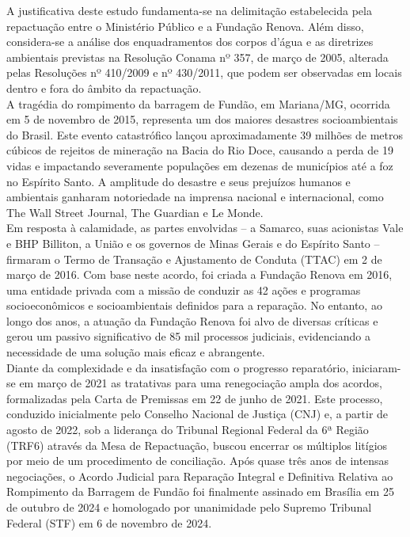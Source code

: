 \hspace*{1.25 cm}  A justificativa deste estudo fundamenta-se na delimitação estabelecida pela repactuação entre o Ministério Público e a Fundação Renova. Além disso, considera-se a análise dos enquadramentos dos corpos d’água e as diretrizes ambientais previstas na Resolução Conama nº 357, de março de 2005, alterada pelas Resoluções nº 410/2009 e nº 430/2011, que podem ser observadas em locais dentro e fora do âmbito da repactuação.\\
%
\hspace*{1.25 cm} A tragédia do rompimento da barragem de Fundão, em Mariana/MG, ocorrida em 5 de novembro de 2015, representa um dos maiores desastres socioambientais do Brasil. Este evento catastrófico lançou aproximadamente 39 milhões de metros cúbicos de rejeitos de mineração na Bacia do Rio Doce, causando a perda de 19 vidas e impactando severamente populações em dezenas de municípios até a foz no Espírito Santo. A amplitude do desastre e seus prejuízos humanos e ambientais ganharam notoriedade na imprensa nacional e internacional, como The Wall Street Journal, The Guardian e Le Monde.\\
%
\hspace*{1.25 cm} Em resposta à calamidade, as partes envolvidas – a Samarco, suas acionistas Vale e BHP Billiton, a União e os governos de Minas Gerais e do Espírito Santo – firmaram o Termo de Transação e Ajustamento de Conduta (TTAC) em 2 de março de 2016. Com base neste acordo, foi criada a Fundação Renova em 2016, uma entidade privada com a missão de conduzir as 42 ações e programas socioeconômicos e socioambientais definidos para a reparação. No entanto, ao longo dos anos, a atuação da Fundação Renova foi alvo de diversas críticas e gerou um passivo significativo de 85 mil processos judiciais, evidenciando a necessidade de uma solução mais eficaz e abrangente.\\
%
\hspace*{1.25 cm} Diante da complexidade e da insatisfação com o progresso reparatório, iniciaram-se em março de 2021 as tratativas para uma renegociação ampla dos acordos, formalizadas pela Carta de Premissas em 22 de junho de 2021. Este processo, conduzido inicialmente pelo Conselho Nacional de Justiça (CNJ) e, a partir de agosto de 2022, sob a liderança do Tribunal Regional Federal da 6ª Região (TRF6) através da Mesa de Repactuação, buscou encerrar os múltiplos litígios por meio de um procedimento de conciliação. Após quase três anos de intensas negociações, o Acordo Judicial para Reparação Integral e Definitiva Relativa ao Rompimento da Barragem de Fundão foi finalmente assinado em Brasília em 25 de outubro de 2024 e homologado por unanimidade pelo Supremo Tribunal Federal (STF) em 6 de novembro de 2024.\\

